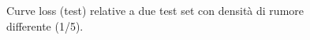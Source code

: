 \documentclass[a4paper,12pt]{article}
\begin{document}
\begin{figure}[htb]
    \centering
    \caption{Curve loss (test) relative a due test set con densità di rumore differente (1/5).}
    \label{fig:c1-1}
\end{figure}
\end{document}
